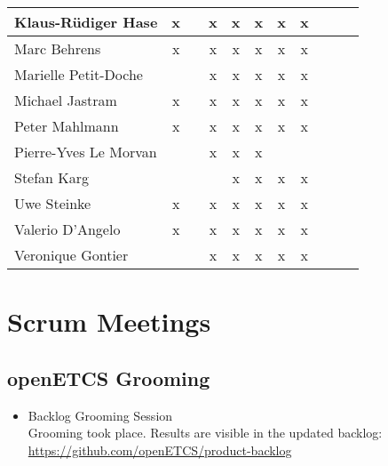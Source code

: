\documentclass[a4paper, 11pt]{article}
\begin{document}
\begin{tabular}{|l|c|c|c|c||c|c|c||c|c|c|}
Klaus-R\"udiger Hase & x &   & x & x & x & x & x \\\hline
Marc Behrens         & x &   & x & x & x & x & x \\\hline
Marielle Petit-Doche &   &   & x & x & x & x & x \\\hline
Michael Jastram      & x &   & x & x & x & x & x  \\\hline
Peter Mahlmann       & x &   & x & x & x & x & x \\\hline
Pierre-Yves Le Morvan &   &   & x & x & x &   &   \\\hline
Stefan Karg          &   &   &   & x & x & x & x \\\hline
Uwe Steinke          & x &   & x & x & x & x & x \\\hline
Valerio D'Angelo     & x &   & x & x  & x & x & x \\\hline
Veronique Gontier    &   &   & x & x & x & x & x \\\hline
\end{tabular}


\section{Scrum Meetings}

\subsection{openETCS Grooming}
\begin{itemize}
\item Backlog Grooming Session\\
Grooming took place. Results are visible in the updated backlog:\\
\url{https://github.com/openETCS/product-backlog}

\end{itemize}
\end{document}
